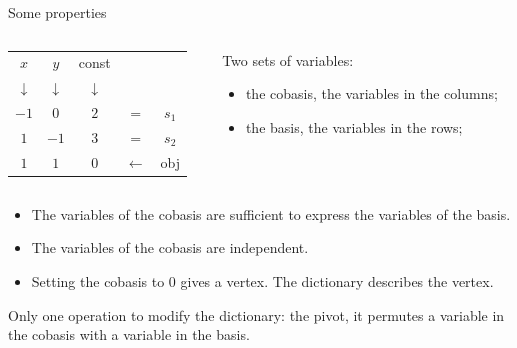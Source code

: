 \begin{frame}{Some properties}
\begin{columns}[c]
\begin{column}{5cm}
\begin{tabular}{| c | c || c || c c |}
	\hline	
	$x$ & $y$ & const & & \\
	$\downarrow$ &$\downarrow$ &$\downarrow$ & & \\
	\hline
	\hline	
   	$-1$ & $0$ & $2$ & = & $s_1$\\ \hline	
   	$1$ & $-1$ & $3$ & = & $s_2$\\ \hline \hline	
   	$1$ & $1$ & $0$ & $\leftarrow$ & obj \\
   	\hline	
\end{tabular}
\end{column}
\begin{column}{5cm}
Two sets of variables:
\begin{itemize}
\item the cobasis, the variables in the columns;
\item the basis, the variables in the rows;
\end{itemize}
\end{column}
\end{columns}
\vspace*{0.5cm}
\begin{itemize}
\item The variables of the cobasis are sufficient to express the variables of the basis.
\item The variables of the cobasis are independent.
\item Setting the cobasis to $0$ gives a vertex. The dictionary describes the vertex.
\end{itemize}

Only one operation to modify the dictionary: the pivot, it permutes a variable in the cobasis with a variable in the basis.
\end{frame}

